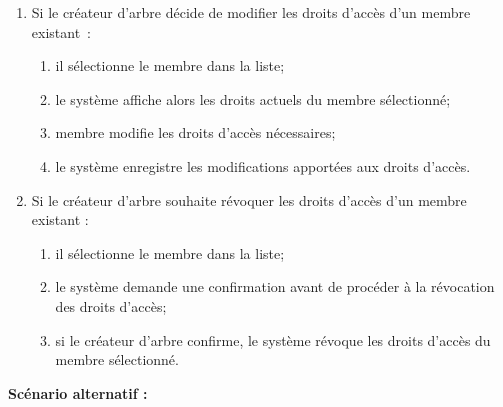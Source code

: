 \begin{enumerate}
  \item Si le créateur d'arbre décide de modifier les droits d'accès d'un membre existant :
    \begin{enumerate}
      \item il sélectionne le membre dans la liste;
      \item le système affiche alors les droits actuels du membre sélectionné;
      \item membre modifie les droits d'accès nécessaires;
      \item le système enregistre les modifications apportées aux droits d'accès.
    \end{enumerate}

  \item Si le créateur d'arbre souhaite révoquer les droits d'accès d'un membre existant :
    \begin{enumerate}
      \item il sélectionne le membre dans la liste;
      \item le système demande une confirmation avant de procéder à la révocation des droits d'accès;
      \item si le créateur d'arbre confirme, le système révoque les droits d'accès du membre sélectionné.
    \end{enumerate}

\end{enumerate}

\textbf{Scénario alternatif :}

